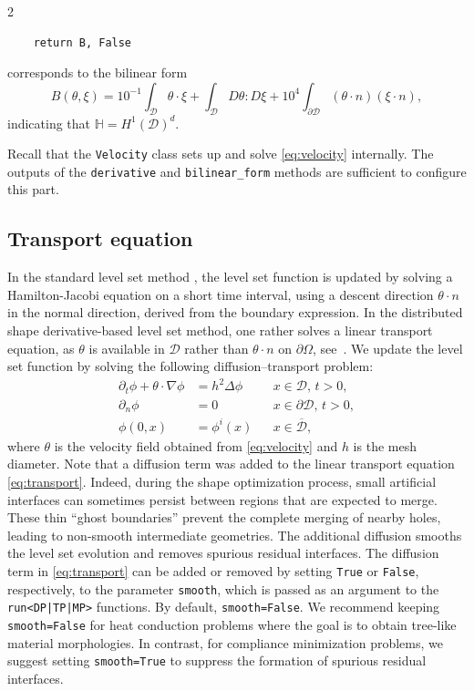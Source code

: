 \documentclass[a4paper, oneside]{article}
\newcommand{\hold}{\mathcal{D}}
\newcommand{\Om}{\Omega}
\newcommand{\code}[1]{\texttt{#1}}
\begin{document}
\begin{multicols}{2}
\begin{lstlisting}
	return B, False	
\end{lstlisting}
corresponds to the bilinear form
\begin{equation*}
B(\theta, \xi) =  {10}^{-1} \int_{\mathcal{D}} \theta \cdot \xi + 
	\int_{\mathcal{D}} D\theta : D\xi +
	{10}^4 \int_{\partial \mathcal{D}}  (\theta \cdot n) (\xi \cdot n),	
\end{equation*}
indicating that $\mathbb{H} = H^1(\mathcal{D})^d$.

Recall that the \code{Velocity} class sets up and solve \eqref{eq:velocity} internally.
The outputs of the \code{derivative} and \code{bilinear\_form} methods
are sufficient to configure this part. 

\subsection{Transport equation}\label{sub:level}

In the standard level set method \cite{MR965860}, the level set function is updated by solving
a Hamilton-Jacobi equation on a short time interval, using a descent direction $\theta\cdot n$
in the normal direction,  derived from the boundary expression.
In the distributed shape derivative-based level set method,
one rather solves a linear transport equation, as $\theta$ is available
in $\hold$ rather than $\theta\cdot n$ on $\partial\Om$, see~\cite{MR3535238}.  
We update the level set function by solving the following diffusion--transport problem:
\begin{equation} \label{eq:transport}
	\begin{aligned}
	\partial_t \phi+\theta\cdot\nabla\phi &= h^2\Delta\phi && x\in \mathcal{D},\, t>0, \\
						\partial_{n} \phi &= 0 && x\in \partial\mathcal{D},\, t>0, \\
							   \phi(0, x) &= \phi^{i}(x) && x\in \overline{\mathcal{D}},
	\end{aligned}
	\end{equation}
where $\theta$ is the velocity field obtained from \eqref{eq:velocity}
and $h$ is the mesh diameter.
Note that a diffusion term was added to
the linear transport equation \eqref{eq:transport}.
Indeed, during the shape optimization process, small artificial interfaces
can sometimes persist between regions that are expected to merge.
These thin ``ghost boundaries'' prevent the complete merging of nearby holes,
leading to non-smooth intermediate geometries.
The additional diffusion smooths the level set evolution
and removes spurious residual interfaces.
The diffusion term in \eqref{eq:transport} can be added or removed
by setting \code{True} or \code{False}, respectively, to the parameter \code{smooth},
which is passed as an argument to the \code{run<DP|TP|MP>} functions.
By default, \code{smooth=False}.
We recommend keeping \code{smooth=False} for heat conduction problems
where the goal is to obtain tree-like material morphologies.
In contrast, for compliance minimization problems,
we suggest setting \code{smooth=True} to suppress
the formation of spurious residual interfaces.


\end{multicols}
\end{document}
